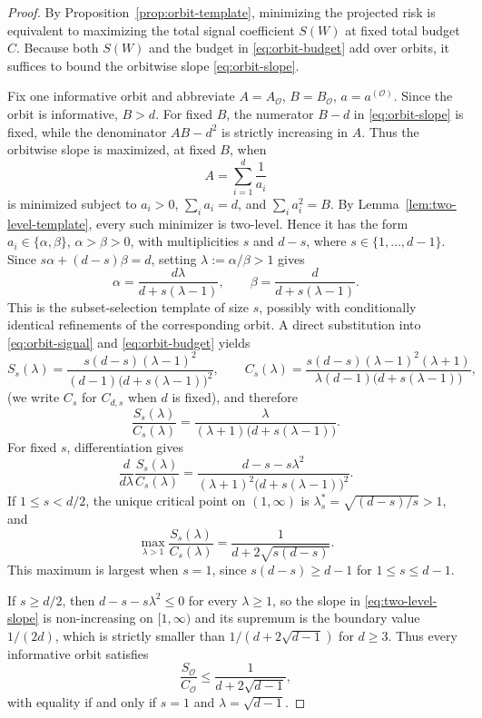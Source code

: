 \documentclass[11pt]{amsart}
\numberwithin{equation}{section}
\theoremstyle{definition}
\begin{document}
\begin{proof}
By Proposition~\ref{prop:orbit-template}, minimizing the projected risk is equivalent to maximizing the
total signal coefficient \(S(W)\) at fixed total budget \(C\).
Because both \(S(W)\) and the budget in \eqref{eq:orbit-budget} add over orbits, it suffices to bound the
orbitwise slope \eqref{eq:orbit-slope}.

Fix one informative orbit and abbreviate \(A=A_{\mathcal O}\), \(B=B_{\mathcal O}\), \(a=a^{(\mathcal O)}\).
Since the orbit is informative, \(B>d\).  For fixed \(B\), the numerator \(B-d\) in
\eqref{eq:orbit-slope} is fixed, while the denominator \(AB-d^2\) is strictly increasing in \(A\).
Thus the orbitwise slope is maximized, at fixed \(B\), when
\[
A=\sum_{i=1}^d \frac{1}{a_i}
\]
is minimized subject to
\(
a_i>0
\),
\(
\sum_i a_i=d
\),
and
\(
\sum_i a_i^2=B
\).
By Lemma~\ref{lem:two-level-template}, every such minimizer is two-level.  Hence it has the form
\(
a_i\in\{\alpha,\beta\}
\),
\(
\alpha>\beta>0
\),
with multiplicities \(s\) and \(d-s\), where \(s\in\{1,\dots,d-1\}\).  Since
\(s\alpha+(d-s)\beta=d\), setting \(\lambda:=\alpha/\beta>1\) gives
\[
\alpha=\frac{d\lambda}{d+s(\lambda-1)},
\qquad
\beta=\frac{d}{d+s(\lambda-1)}.
\]
This is the subset-selection template of size \(s\), possibly with conditionally identical refinements
of the corresponding orbit.
A direct substitution into \eqref{eq:orbit-signal} and \eqref{eq:orbit-budget} yields
\[
S_s(\lambda)
=
\frac{s(d-s)(\lambda-1)^2}{(d-1)\bigl(d+s(\lambda-1)\bigr)^2},
\qquad
C_s(\lambda)
=
\frac{s(d-s)(\lambda-1)^2(\lambda+1)}
{\lambda(d-1)\bigl(d+s(\lambda-1)\bigr)}, \tag{11.13}\label{eq:two-level-sc}
\]
(we write \(C_s\) for \(C_{d,s}\) when \(d\) is fixed),
and therefore
\[
\frac{S_s(\lambda)}{C_s(\lambda)}
=
\frac{\lambda}{(\lambda+1)\bigl(d+s(\lambda-1)\bigr)}. \tag{11.14}\label{eq:two-level-slope}
\]
For fixed \(s\), differentiation gives
\[
\frac{d}{d\lambda}\frac{S_s(\lambda)}{C_s(\lambda)}
=
\frac{d-s-s\lambda^2}{(\lambda+1)^2\bigl(d+s(\lambda-1)\bigr)^2}. \tag{11.15}\label{eq:two-level-derivative}
\]
If \(1\le s< d/2\), the unique critical point on \((1,\infty)\) is
\(
\lambda_s^\ast=\sqrt{(d-s)/s}>1
\),
and
\[
\max_{\lambda>1}\frac{S_s(\lambda)}{C_s(\lambda)}
=
\frac{1}{d+2\sqrt{s(d-s)}}. \tag{11.16}\label{eq:two-level-max}
\]
This maximum is largest when \(s=1\), since \(s(d-s)\ge d-1\) for \(1\le s\le d-1\).

If \(s\ge d/2\), then \(d-s-s\lambda^2\le 0\) for every \(\lambda\ge 1\), so the slope in
\eqref{eq:two-level-slope} is non-increasing on \([1,\infty)\) and its supremum is the boundary value
\(1/(2d)\), which is strictly smaller than \(1/(d+2\sqrt{d-1})\) for \(d\ge 3\).
Thus every informative orbit satisfies
\[
\frac{S_{\mathcal O}}{C_{\mathcal O}}
\le
\frac{1}{d+2\sqrt{d-1}}, \tag{11.17}\label{eq:orbit-global-slope}
\]
with equality if and only if \(s=1\) and \(\lambda=\sqrt{d-1}\).


\end{proof}
\end{document}
